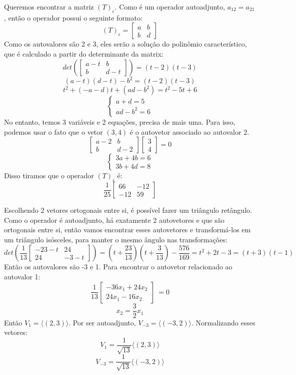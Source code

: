 \documentclass{homework}
\begin{document}
\exercise*
Queremos encontrar a matriz $(T)_\epsilon$. Como é um operador autoadjunto, $a_{12} = a_{21}$, então o operador possui o seguinte formato:
\[(T)_\epsilon = \begin{bmatrix}
a & b\\
b & d
\end{bmatrix}\]
Como os autovalores são 2 e 3, eles serão a solução do polinômio característico, que é calculado a partir do determinante da matrix:
\[det\left(\begin{bmatrix}
a-t & b\\
b & d-t
\end{bmatrix}\right) = (t-2)(t-3)\]
\[(a-t)(d-t)-b^2 = (t-2)(t-3)\]
\[t^2 + (-a-d)t + (ad-b^2) = t^2 -5t +6\]
\[\begin{cases}
a+d=5\\
ad-b^2=6
\end{cases}\]
No entanto, temos 3 variáveis e 2 equações, precisa de mais uma. Para isso, podemos usar o fato que o vetor $(3,4)$ é o autovetor associado ao autovalor 2.
\[\begin{bmatrix}
a-2 & b\\
b & d-2
\end{bmatrix}
\begin{bmatrix}
3\\
4
\end{bmatrix} = 0\]
\[\begin{cases}
3a + 4b = 6\\
3b + 4d = 8
\end{cases}\]
Disso tiramos que o operador $(T)_\epsilon$ é:
\[\frac{1}{25}\begin{bmatrix}
66 & -12\\
-12 & 59
\end{bmatrix}\]

\exercise*
Escolhendo 2 vetores ortogonais entre si, é possível fazer um triângulo retângulo. Como o operador é autoadjunto, há exatamente 2 autovetores e que são ortogonais entre si, então vamos encontrar esses autovetores e transformá-los em um triângulo isósceles, para manter o mesmo ângulo nas transformações:
\[det\left(\frac{1}{13}\begin{bmatrix}
-23-t & 24\\
24 & -3-t
\end{bmatrix}\right) = (t+\frac{23}{13})(t+\frac{3}{13})-\frac{576}{169} = t^2 + 2t - 3 = (t+3)(t-1)\]
Então os autovalores são -3 e 1. Para encontrar o autovetor relacionado ao autovalor 1:
\[\frac{1}{13}\begin{bmatrix}
-36x_1 + 24x_2\\
24x_1 -16x_2
\end{bmatrix}\ = 0\]
\[x_2 = \frac{3}{2}x_1\]
Então $V_1 = \langle(2,3)\rangle$. Por ser autoadjunto, $V_{-3} = \langle(-3,2)\rangle$. Normalizando esses vetores:
\[V_1 = \frac{1}{\sqrt{13}}\langle(2,3)\rangle\]
\[V_{-3} = \frac{1}{\sqrt{13}}\langle(-3,2)\rangle\]
\end{document}
